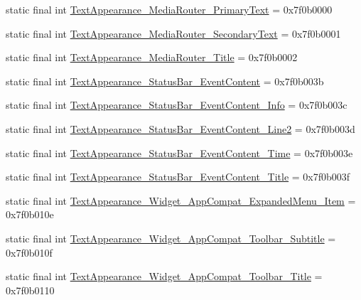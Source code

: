 \begin{CompactItemize}
\item 
static final int \hyperlink{classandroid_1_1support_1_1graphics_1_1drawable_1_1animated_1_1_r_1_1style_5c8cd2aaf08e05f0fa3e87c958d5fe4c}{TextAppearance\_\-MediaRouter\_\-PrimaryText} = 0x7f0b0000
\item 
static final int \hyperlink{classandroid_1_1support_1_1graphics_1_1drawable_1_1animated_1_1_r_1_1style_ce3ef7eedd36908e99de7cc7df7bed53}{TextAppearance\_\-MediaRouter\_\-SecondaryText} = 0x7f0b0001
\item 
static final int \hyperlink{classandroid_1_1support_1_1graphics_1_1drawable_1_1animated_1_1_r_1_1style_164d31a46f3999605ab596a7e5df59ac}{TextAppearance\_\-MediaRouter\_\-Title} = 0x7f0b0002
\item 
static final int \hyperlink{classandroid_1_1support_1_1graphics_1_1drawable_1_1animated_1_1_r_1_1style_1927a4d384a0fdb5d0dc00a78f6b5d2a}{TextAppearance\_\-StatusBar\_\-EventContent} = 0x7f0b003b
\item 
static final int \hyperlink{classandroid_1_1support_1_1graphics_1_1drawable_1_1animated_1_1_r_1_1style_fe37febdd92c1529358db2dabb75f218}{TextAppearance\_\-StatusBar\_\-EventContent\_\-Info} = 0x7f0b003c
\item 
static final int \hyperlink{classandroid_1_1support_1_1graphics_1_1drawable_1_1animated_1_1_r_1_1style_d28a1915d4886f6cd32bf56ecfa93de1}{TextAppearance\_\-StatusBar\_\-EventContent\_\-Line2} = 0x7f0b003d
\item 
static final int \hyperlink{classandroid_1_1support_1_1graphics_1_1drawable_1_1animated_1_1_r_1_1style_f2d0ef56a3b77da6e792d64f4a20a4f7}{TextAppearance\_\-StatusBar\_\-EventContent\_\-Time} = 0x7f0b003e
\item 
static final int \hyperlink{classandroid_1_1support_1_1graphics_1_1drawable_1_1animated_1_1_r_1_1style_35667d3d237648275fc4a4c3da0c777e}{TextAppearance\_\-StatusBar\_\-EventContent\_\-Title} = 0x7f0b003f
\item 
static final int \hyperlink{classandroid_1_1support_1_1graphics_1_1drawable_1_1animated_1_1_r_1_1style_2a4cee239838200cb6abacf80c1daf74}{TextAppearance\_\-Widget\_\-AppCompat\_\-ExpandedMenu\_\-Item} = 0x7f0b010e
\item 
static final int \hyperlink{classandroid_1_1support_1_1graphics_1_1drawable_1_1animated_1_1_r_1_1style_570f410683c76994b1a5b06154089f33}{TextAppearance\_\-Widget\_\-AppCompat\_\-Toolbar\_\-Subtitle} = 0x7f0b010f
\item 
static final int \hyperlink{classandroid_1_1support_1_1graphics_1_1drawable_1_1animated_1_1_r_1_1style_414df076fcd4c0ef1c2b85069fd35760}{TextAppearance\_\-Widget\_\-AppCompat\_\-Toolbar\_\-Title} = 0x7f0b0110

\end{CompactItemize}
